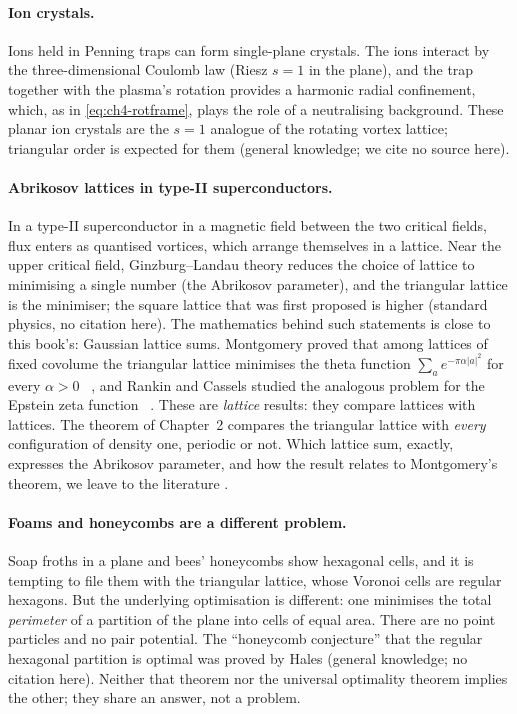 \paragraph{Ion crystals.} Ions held in Penning traps can form single-plane crystals. The ions interact by the
three-dimensional Coulomb law (Riesz $s=1$ in the plane), and the trap together with the plasma's rotation provides a
harmonic radial confinement, which, as in \eqref{eq:ch4-rotframe}, plays the role of a neutralising background.
These planar ion crystals are the $s=1$ analogue of the rotating vortex lattice; triangular order is expected for
them \tierC{} (general knowledge; we cite no source here).

\paragraph{Abrikosov lattices in type-II superconductors.} In a type-II superconductor in a magnetic field between
the two critical fields, flux enters as quantised vortices, which arrange themselves in a lattice. Near the upper
critical field, Ginzburg--Landau theory reduces the choice of lattice to minimising a single number (the Abrikosov
parameter), and the triangular lattice is the minimiser; the square lattice that was first proposed is higher
\tierC{} (standard physics, no citation here). The mathematics behind such statements is close to this book's:
Gaussian lattice sums. Montgomery proved that among lattices of fixed covolume the triangular lattice minimises the
theta function $\sum_{a}e^{-\pi\alpha|a|^2}$ for every $\alpha>0$~\cite{montgomery} \tierL, and Rankin and Cassels
studied the analogous problem for the Epstein zeta function~\cite{rankin,cassels} \tierL. These are \emph{lattice}
results: they compare lattices with lattices. The theorem of Chapter~2 compares the triangular lattice with
\emph{every} configuration of density one, periodic or not. Which lattice sum, exactly, expresses the Abrikosov
parameter, and how the result relates to Montgomery's theorem, we leave to the literature \tierC.

\paragraph{Foams and honeycombs are a different problem.} Soap froths in a plane and bees' honeycombs show hexagonal
cells, and it is tempting to file them with the triangular lattice, whose Voronoi cells are regular hexagons. But the
underlying optimisation is different: one minimises the total \emph{perimeter} of a partition of the plane into
cells of equal area. There are no point particles and no pair potential. The ``honeycomb conjecture'' that the
regular hexagonal partition is optimal was proved by Hales \tierC{} (general knowledge; no citation here). Neither that theorem nor the
universal optimality theorem implies the other; they share an answer, not a problem.

